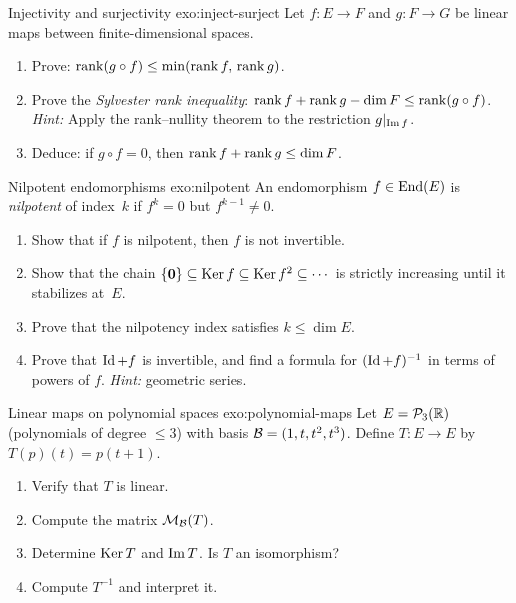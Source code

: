 \begin{exercise}{Injectivity and surjectivity \challenging}%
{exo:inject-surject}
Let $f\colon E\to F$ and $g\colon F\to G$ be linear maps between
finite-dimensional spaces.
\begin{enumerate}[label=(\alph*)]
  \item Prove: $\operatorname{rank}(g\circ f) \leq \min(\operatorname{rank} f,\, \operatorname{rank} g)$.
  \item Prove the \emph{Sylvester rank inequality}:
    $\operatorname{rank} f + \operatorname{rank} g - \dim F \leq \operatorname{rank}(g\circ f)$.
    \textit{Hint:} Apply the rank--nullity theorem to the restriction
    $g{|_{\operatorname{Im} f}}$.
  \item Deduce: if $g\circ f = 0$, then
    $\operatorname{rank} f + \operatorname{rank} g \leq \dim F$.
\end{enumerate}
\end{exercise}

\begin{exercise}{Nilpotent endomorphisms \challenging}{exo:nilpotent}
An endomorphism $f\in\operatorname{End}(E)$ is \emph{nilpotent} of index~$k$ if
$f^k = 0$ but $f^{k-1}\neq 0$.
\begin{enumerate}[label=(\alph*)]
  \item Show that if $f$ is nilpotent, then $f$ is not invertible.
  \item Show that the chain $\left\{\mathbf{0}\right\}\subseteq\operatorname{Ker} f\subseteq
    \operatorname{Ker} f^2\subseteq\cdots$ is strictly increasing until it
    stabilizes at~$E$.
  \item Prove that the nilpotency index satisfies $k\leq\dim E$.
  \item Prove that $\operatorname{Id} + f$ is invertible, and find a formula for
    $(\operatorname{Id} + f)^{-1}$ in terms of powers of $f$.
    \textit{Hint:} geometric series.
\end{enumerate}
\end{exercise}

\begin{exercise}{Linear maps on polynomial spaces \challenging}%
{exo:polynomial-maps}
Let $E = {\mathcal{P}}_3({\mathbb{R}})$ (polynomials of degree $\leq 3$) with basis
${\mathcal{B}} = (1,t,t^2,t^3)$. Define $T\colon E\to E$ by $T(p)(t) = p(t+1)$.
\begin{enumerate}[label=(\alph*)]
  \item Verify that $T$ is linear.
  \item Compute the matrix $\mathcal{M}_{\mathcal{B}}(T)$.
  \item Determine $\operatorname{Ker} T$ and $\operatorname{Im} T$. Is $T$ an isomorphism?
  \item Compute $T^{-1}$ and interpret it.
\end{enumerate}
\end{exercise}

